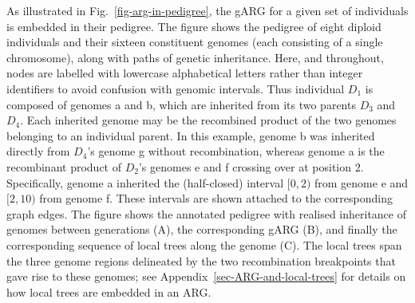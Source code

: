 \documentclass{article}
\newcommand{\noderef}[1]{\textsf{#1}}
\begin{document}
As illustrated in Fig.~\ref{fig-arg-in-pedigree},
the gARG for a given set of individuals is embedded in their pedigree.
The figure shows the pedigree of eight diploid individuals
and their sixteen constituent genomes (each consisting of a single chromosome),
along with paths of genetic inheritance.
Here, and throughout,
nodes are labelled with lowercase alphabetical letters
rather than integer identifiers to avoid confusion with genomic intervals.
Thus individual $D_1$ is composed
of genomes \noderef{a} and \noderef{b}, which are inherited from its
two parents $D_3$ and $D_4$. Each inherited genome may be the recombined product
of the two genomes belonging to an individual parent.
In this example,
genome \noderef{b} was inherited directly from $D_4$'s genome \noderef{g} without
recombination, whereas
genome \noderef{a} is the recombinant product of
$D_2$'s genomes \noderef{e} and \noderef{f} crossing over at position 2.
Specifically, genome \noderef{a} inherited the (half-closed)
interval $[0, 2)$ from genome \noderef{e} and $[2, 10)$ from genome \noderef{f}.
These intervals are shown attached to the corresponding graph edges.
The figure shows the annotated pedigree with realised inheritance of genomes
between generations (A), the corresponding gARG (B), and finally the corresponding
sequence of local trees along the
genome (C).
The local trees span the three genome regions delineated
by the two recombination breakpoints that gave rise to these genomes;
see Appendix~\ref{sec-ARG-and-local-trees} for details
on how local trees are embedded in an ARG.

\end{document}

